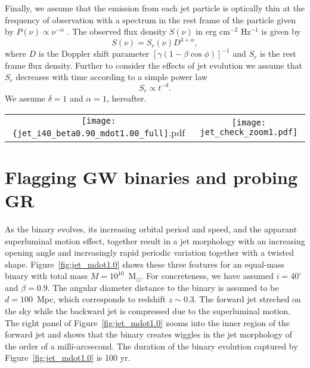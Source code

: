 \documentclass[iop]{emulateapj}
\begin{document}
Finally, we assume that the emission from each jet particle is
optically thin at the frequency of observation with a spectrum in the
rest frame of the particle given by $P(\nu)\propto \nu^{-\alpha}$
\citep{1982ApJ...262..478G}.  The observed flux density $S(\nu)$ in erg
cm$^{-2}$ Hz$^{-1}$ is given by
\begin{equation}
  S(\nu)=S_r(\nu)D^{3+\alpha},
\end{equation}
where $D$ is the Doppler shift parameter
$[\gamma(1-\beta\cos\phi)]^{-1}$ and $S_r$ is the rest frame flux
density.  Further to consider the effects of jet evolution we assume
that $S_r$ decreases with time according to a simple power law
\begin{equation}
  S_r\propto t^{-\delta}.
\end{equation}
We assume $\delta=1$ and $\alpha=1$, hereafter. 

\begin{figure*}
\begin{center}
  \begin{tabular}{cc}
    \texttt{[image: \{jet\_i40\_beta0.90\_mdot1.00\_full]}.pdf} &
    \texttt{[image: jet\_check\_zoom1.pdf]}
  \end{tabular}
\end{center}
\caption{The left panel shows forward and backward jets for an
  equal-mass binary with total mass $M=10^{10}$~M$_\odot$.  We have
  assumed $i=40^\circ$, $\beta=0.9$, and $d = 100$~Mpc.  The jets are
  twisted because of the apparant superluminal motion.  Also evident
  is the opening of the jet and the radio jet chirp.  Right panel
  shows normalised brightness of the inner 30~mas region of the
  forward jet.}
\label{fig:jet_mdot1.0}
\end{figure*}

\section{Flagging GW binaries and probing GR}

As the binary evolves, its increasing orbital period and speed, and
the apparant superluminal motion effect, together result in a jet
morphology with an increasing opening angle and increasingly rapid
periodic variation together with a twisted shape.
Figure~\ref{fig:jet_mdot1.0} shows these three features for an
equal-mass binary with total mass $M=10^{10}$~M$_\odot$.  For
concreteness, we have assumed $i=40^\circ$ and $\beta=0.9$.  The
angular diameter distance to the binary is assumed to be $d =
100$~Mpc, which corresponds to redshift $z\sim 0.3$.  The forward jet
streched on the sky while the backward jet is compressed due to the
superluminal motion.  The right panel of Figure~\ref{fig:jet_mdot1.0}
zooms into the inner region of the forward jet and shows that the
binary creates wiggles in the jet morphology of the order of a
milli-arcsecond.  The duration of the binary evolution captured by
Figure~\ref{fig:jet_mdot1.0} is 100 yr.
\end{document}
